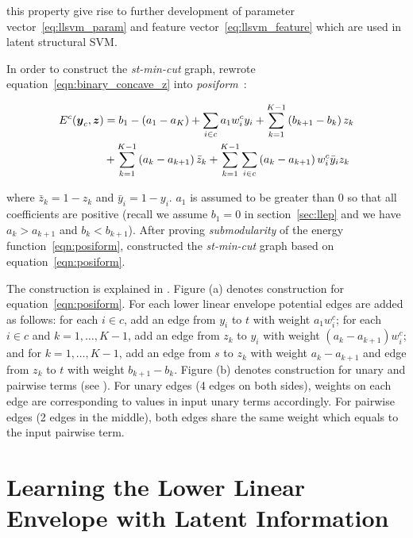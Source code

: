 \noindent this property give rise to further development of
parameter vector~\eqref{eq:llsvm_param} and feature
vector~\eqref{eq:llsvm_feature} which are used in latent
structural SVM.

In order to construct the \emph{st-min-cut} graph,
 rewrote
equation~\eqref{eqn:binary_concave_z} into
\emph{posiform}~\cite{Boros:MATH02}:

\begin{align}
  \label{eqn:posiform}  
  E^c({\boldsymbol{y}}_c, {\boldsymbol{z}})
  &= b_1 - (a_1 - a_K) + \sum_{i \in c} a_1 w^c_i y_i
  {}+ \sum_{k = 1}^{K - 1} \left( b_{k+1} - b_k \right) z_k\\
  &+ \sum_{k = 1}^{K - 1} \left( a_k - a_{k+1} \right) \bar{z}_k
  {}+ \sum_{k = 1}^{K - 1} \sum_{i \in c} \left( a_k - a_{k+1}
    \right) w^c_i \bar{y}_i z_k \nonumber
\end{align}

\noindent where $\bar{z}_k = 1 - z_k$ and $\bar{y}_i = 1 - y_i$.
$a_1$ is assumed to be greater than $0$ so that all coefficients
are positive (recall we assume $b_1=0$ in section~\ref{sec:llep}
and we have $a_k > a_{k+1}$ and $b_k < b_{k+1}$). After proving
\emph{submodularity} of the energy function~\eqref{eqn:posiform},
 constructed the \emph{st-min-cut} graph
based on equation~\eqref{eqn:posiform}.

The construction is explained in . Figure
(a) denotes construction for equation~\eqref{eqn:posiform}. For
each lower linear envelope potential edges are added as follows:
for each $i \in c$, add an edge from $y_i$ to $t$ with weight
$a_1 w^c_i$; for each $i \in c$ and $k = 1, \ldots, K-1$, add an
edge from $z_k$ to $y_i$ with weight $(a_{k} - a_{k+1}) w^c_i$;
and for $k = 1, \ldots, K-1$, add an edge from $s$ to $z_k$ with
weight $a_k - a_{k+1}$ and edge from $z_k$ to $t$ with weight
$b_{k+1} - b_k$. Figure (b) denotes construction for unary and
pairwise terms (see \cite{Kolmogorov:PAMI04}). For unary edges (4
edges on both sides), weights on each edge are corresponding to
values in input unary terms accordingly. For pairwise edges (2
edges in the middle), both edges share the same weight which
equals to the input pairwise term.

\section{Learning the Lower Linear Envelope with Latent Information}
\label{sec:learning}

